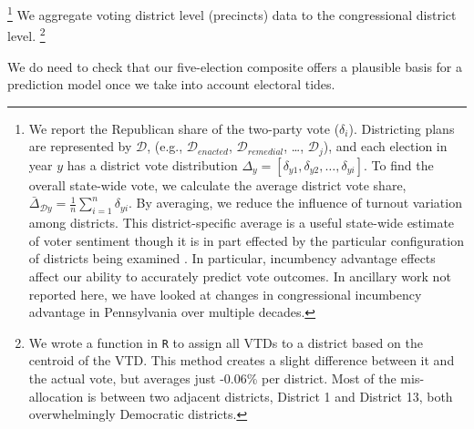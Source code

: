    \footnote{We report the Republican share of the two-party vote ($\delta_{i}$). Districting plans are represented by $\mathcal D $, (e.g., $\mathcal D_{enacted}$, $\mathcal D_{remedial}$, \dots, $\mathcal D_{j}$), and each election in year $ y $ has a district vote distribution $ \Delta_{y} = [\delta_{y1}, \delta_{y2}, \dots, \delta_{yi}] $. To find the overall state-wide vote, we calculate the average district vote share, $ \bar{\Delta}_{\mathcal D y} = \frac{1}{n}\sum\limits_{i=1}^{n} \delta_{yi} $. By averaging, we reduce the influence of turnout variation among districts. This district-specific average is a useful state-wide estimate of voter sentiment though it is in part effected by the particular configuration of districts being examined \citep[see e.g.][cf. \cite{Grofman_et_al_1997__IntedgratedPerspective_ES}]{Kastellec_et_al_2008_PS}. In particular, incumbency advantage effects affect our ability to accurately predict vote outcomes. In ancillary work not reported here, we have looked at changes in congressional incumbency advantage in Pennsylvania over multiple decades.}
    We aggregate voting district level (precincts) data to the congressional district level.
	   \footnote{We wrote a function in \texttt{R} to assign all VTDs to a district based on the centroid of the VTD. This method creates a slight difference between it and the actual vote, but averages just -0.06\% per district. Most of the mis-allocation is between two adjacent districts, District 1 and District 13, both overwhelmingly Democratic districts.}
\par
    We do need to check that our five-election composite offers a plausible basis for a prediction model once we take into account electoral tides. 
